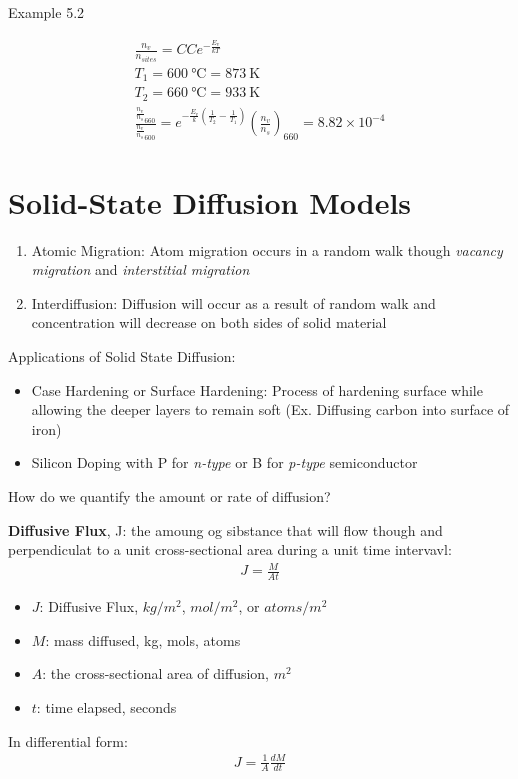 \documentclass{article}
\begin{document}
Example 5.2

\begin{multline}
    \frac{n_v}{n_{sites}} = C  C e^{-\frac{E_v}{kT}} \\ 
    T_1 = \SI{600}{\celsius} = \SI{873}{\kelvin} \\
    T_2 = \SI{660}{\celsius} = \SI{933}{\kelvin} \\
    \frac{\frac{n_v}{n_s}_{660}}{\frac{n_v}{n_s}_{600}} = e^{-\frac{E_v}{k}(\frac{1}{T_2}- \frac{1}{T_1})}
    (\frac{n_v}{n_s})_{660}  = 8.82 \times 10 ^{-4}
\end{multline}

\section{Solid-State Diffusion Models}
\begin{enumerate}
    \item Atomic Migration: Atom migration occurs in a random walk though \textit{vacancy migration} and \textit{interstitial migration}
    \item Interdiffusion: Diffusion will occur as a result of random walk and concentration will decrease on both sides of solid material
\end{enumerate}

Applications of Solid State Diffusion:
\begin{itemize}
    \item Case Hardening or Surface Hardening: Process of hardening surface while allowing the deeper layers to remain soft (Ex. Diffusing carbon into surface of iron)
    \item Silicon Doping with P for \textit{n-type} or B for \textit{p-type} semiconductor
\end{itemize}

How do we quantify the amount or rate of diffusion?

\textbf{Diffusive Flux}, J: the amoung og sibstance that will flow though and perpendiculat to a unit cross-sectional area during a unit time intervavl:
\pagebreak
\begin{equation}
    \begin{split}
        J = \frac{M}{At}
    \end{split}
\end{equation}
\begin{itemize}
    \item $J$: Diffusive Flux, $kg/m^2$, $\textit{mol}/m^2$, or $\textit{atoms}/m^2$
    \item $M$: mass diffused, kg, mols, atoms
    \item $A$: the cross-sectional area of diffusion, $m^2$
    \item $t$: time elapsed, seconds
\end{itemize}
In differential form:
\begin{equation}
    \begin{split}
        J = \frac{1}{A}\frac{dM}{dt}
    \end{split}
\end{equation}
\end{document}
